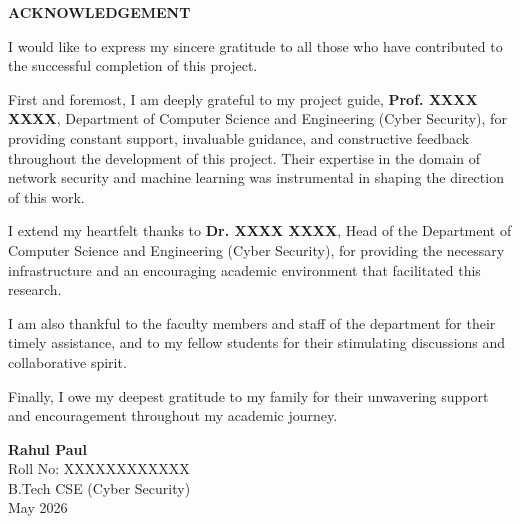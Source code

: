 \thispagestyle{frontmatter}
\newpage

\begin{center}
\vspace*{1.5cm}
{\LARGE \textbf{ACKNOWLEDGEMENT}}\\[1.5cm]
\end{center}

\noindent I would like to express my sincere gratitude to all those who have contributed to the successful completion of this project.

\vspace{0.5cm}
\noindent First and foremost, I am deeply grateful to my project guide, \textbf{Prof. XXXX XXXX}, Department of Computer Science and Engineering (Cyber Security), for providing constant support, invaluable guidance, and constructive feedback throughout the development of this project. Their expertise in the domain of network security and machine learning was instrumental in shaping the direction of this work.

\vspace{0.5cm}
\noindent I extend my heartfelt thanks to \textbf{Dr. XXXX XXXX}, Head of the Department of Computer Science and Engineering (Cyber Security), for providing the necessary infrastructure and an encouraging academic environment that facilitated this research.

\vspace{0.5cm}
\noindent I am also thankful to the faculty members and staff of the department for their timely assistance, and to my fellow students for their stimulating discussions and collaborative spirit.

\vspace{0.5cm}
\noindent Finally, I owe my deepest gratitude to my family for their unwavering support and encouragement throughout my academic journey.

\vspace{2cm}
\begin{flushright}
\textbf{Rahul Paul}\\
Roll No: XXXXXXXXXXXX\\
B.Tech CSE (Cyber Security)\\
May 2026
\end{flushright}
